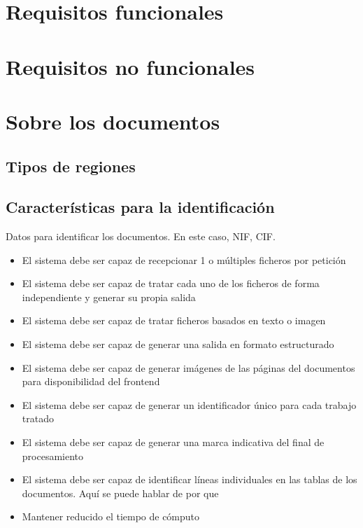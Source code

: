 \section{Requisitos funcionales}

\section{Requisitos no funcionales}

\section{Sobre los documentos}

\subsection{Tipos de regiones}

\subsection{Características para la identificación}

Datos para identificar los documentos. En este caso, NIF, CIF.



\begin{itemize}
	\item El sistema debe ser capaz de recepcionar 1 o múltiples ficheros por petición
	\item El sistema debe ser capaz de tratar cada uno de los ficheros de forma independiente y generar su propia salida
	\item El sistema debe ser capaz de tratar ficheros basados en texto o imagen
	\item El sistema debe ser capaz de generar una salida en formato estructurado
	\item El sistema debe ser capaz de generar imágenes de las páginas del documentos para disponibilidad del frontend
	\item El sistema debe ser capaz de generar un identificador único para cada trabajo tratado
	\item El sistema debe ser capaz de generar una marca indicativa del final de procesamiento
	\item El sistema debe ser capaz de identificar líneas individuales en las tablas de los documentos. Aquí se puede hablar de por que
\end{itemize}

\begin{itemize}
	\item Mantener reducido el tiempo de cómputo    
\end{itemize}
